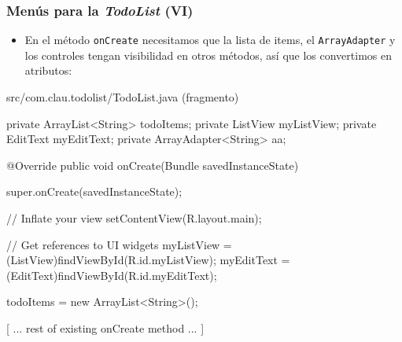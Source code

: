 \documentclass[hyperref={pdfpagelabels=true},ucs]{beamer}
\begin{document}
\begin{frame}[fragile,shrink=5]
\frametitle{Menús para la \emph{TodoList} (VI)}

\begin{itemize}
\item En el método \verb|onCreate| necesitamos que la lista de items, el
  \verb|ArrayAdapter| y los controles tengan visibilidad en otros
  métodos, así que los convertimos en atributos:
\end{itemize}

\begin{tiny}
\begin{block}{src/com.clau.todolist/TodoList.java (fragmento)}
\begin{java}
private ArrayList<String> todoItems;
private ListView myListView;
private EditText myEditText;
private ArrayAdapter<String> aa;

@Override
public void onCreate(Bundle savedInstanceState) {
  super.onCreate(savedInstanceState);

  // Inflate your view
  setContentView(R.layout.main);

  // Get references to UI widgets
  myListView = (ListView)findViewById(R.id.myListView);
  myEditText = (EditText)findViewById(R.id.myEditText);

  todoItems = new ArrayList<String>();

  [ ... rest of existing onCreate method ... ]

}
\end{java}
\end{block}
\end{tiny}

\end{frame}
\end{document}
